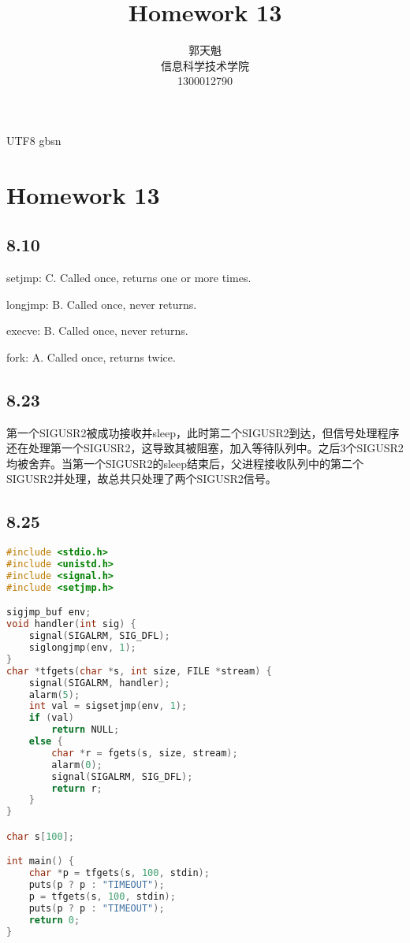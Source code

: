 \documentclass {article}
\begin{document}
  \begin {CJK*} {UTF8} {gbsn}
    \title {\textbf {\Huge Homework 13}}
		\author {郭天魁 \\ 信息科学技术学院 \\ 1300012790}

		\maketitle
		

		\section{Homework 13}
			\subsection{8.10}
				setjmp:		C. Called once, returns one or more times.

				longjmp:	B. Called once, never returns.

				execve:		B. Called once, never returns.

				fork:			A. Called once, returns twice.

			\subsection{8.23}
				第一个SIGUSR2被成功接收并sleep，此时第二个SIGUSR2到达，但信号处理程序还在处理第一个SIGUSR2，这导致其被阻塞，加入等待队列中。之后3个SIGUSR2均被舍弃。当第一个SIGUSR2的sleep结束后，父进程接收队列中的第二个SIGUSR2并处理，故总共只处理了两个SIGUSR2信号。

			\subsection{8.25}
				\begin{lstlisting}[language=C]
#include <stdio.h>
#include <unistd.h>
#include <signal.h>
#include <setjmp.h>

sigjmp_buf env;
void handler(int sig) {
	signal(SIGALRM, SIG_DFL);
	siglongjmp(env, 1);
}
char *tfgets(char *s, int size, FILE *stream) {
	signal(SIGALRM, handler);
	alarm(5);
	int val = sigsetjmp(env, 1);
	if (val)
		return NULL;
	else {
		char *r = fgets(s, size, stream);
		alarm(0);
		signal(SIGALRM, SIG_DFL);
		return r;
	}
}

char s[100];

int main() {
	char *p = tfgets(s, 100, stdin);
	puts(p ? p : "TIMEOUT");
	p = tfgets(s, 100, stdin);
	puts(p ? p : "TIMEOUT");
	return 0;
}
				\end{lstlisting}

  \end {CJK*}
\end{document}
